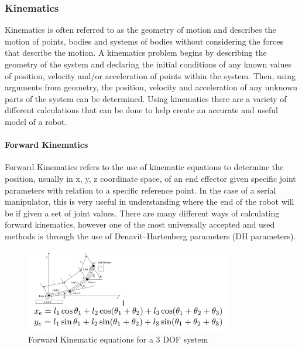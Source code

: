         \subsubsection{Kinematics}
        Kinematics is  often referred to as the geometry of motion and describes the motion of points, bodies and systems of bodies without considering the forces that describe the motion. A kinematics problem begins by describing the geometry of the system and declaring the initial conditions of any known values of position, velocity and/or acceleration of points within the system. Then, using arguments from geometry, the position, velocity and acceleration of any unknown parts of the system can be determined. Using kinematics there are a variety of different calculations that can be done to help create an accurate and useful model of a robot. 
            \paragraph*{Forward Kinematics}
            Forward Kinematics refers to the use of kinematic equations to determine the position, usually in x, y, z coordinate space, of an end effector given specific joint parameters with relation to a specific reference point. In the case of a serial manipulator, this is very useful in understanding where the end of the robot will be if given a set of joint values. There are many different ways of calculating forward kinematics, however one of the most universally accepted and used methods is through the use of Denavit–Hartenberg parameters (DH parameters).
            \begin{figure}[H] 
                \centering
                \includegraphics[width=0.8\textwidth]{3dof.PNG}
                \caption{Forward Kinematic equations for a 3 DOF system}
                \label{fig:FWKIN_3DOF}
            \end{figure}
